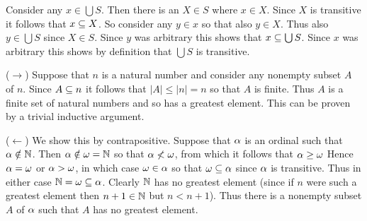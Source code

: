
\begin{solution}
	Consider any $x \in \bigcup S$.
    Then there is an $X \in S$ where $x \in X$.
    Since $X$ is transitive it follows that $x \ss X$.
    So consider any $y \in x$ so that also $y \in X$.
    Thus also $y \in \bigcup S$ since $X \in S$.
    Since $y$ was arbitrary this shows that $x \ss \bigcup S$.
    Since $x$ was arbitrary this shows by definition that $\bigcup S$ is transitive. \qedsymbol
\end{solution}


\begin{solution}
	($\to$) Suppose that $n$ is a natural number and consider any nonempty subset $A$ of $n$.
    Since $A \ss n$ it follows that $|A| \leq |n| = n$ so that $A$ is finite.
    Thus $A$ is a finite set of natural numbers and so has a greatest element.
    This can be proven by a trivial inductive argument.

    ($\leftarrow$) We show this by contrapositive.
    Suppose that $\a$ is an ordinal such that $\a \notin \nats$.
    Then $\a \notin \w = \nats$ so that $\a \nless \w$, from which it follows that $\a \geq \w$
    Hence $\a = \w$ or $\a > \w$, in which case $\w \in \a$ so that $\w \ss \a$ since $\a$ is transitive.
    Thus in either case $\nats = \w \ss \a$.
    Clearly $\nats$ has no greatest element (since if $n$ were such a greatest element then $n+1 \in \nats$ but $n < n+1$).
    Thus there is a nonempty subset $A$ of $\a$ such that $A$ has no greatest element.
\end{solution}


